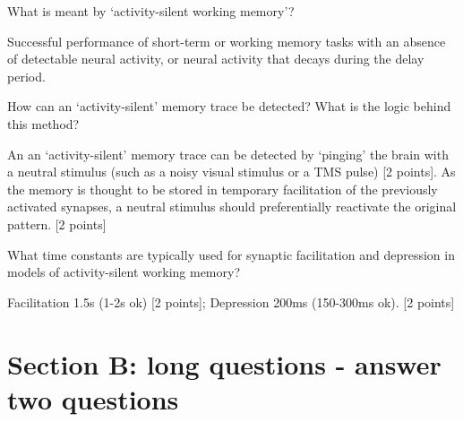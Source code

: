 \documentclass{cs-uob-exam}
\begin{document}
\begin{questions}
\question What is meant by `activity-silent working memory'?
\begin{solution}
Successful performance of short-term or working memory tasks with an absence of detectable neural activity, or neural activity that decays during the delay period.
\end{solution}

\question How can an `activity-silent' memory trace be detected? What is the logic behind this method?
\begin{solution}
An an ‘activity-silent’ memory trace can be detected by ‘pinging’ the brain with a neutral stimulus (such as a noisy visual stimulus or a TMS pulse) [2 points]. As the memory is thought to be stored in temporary facilitation of the previously activated synapses, a neutral stimulus should preferentially reactivate the original pattern. [2 points]
\end{solution}

\question What time constants are typically used for synaptic facilitation and depression in models of activity-silent working memory?

\begin{solution}
Facilitation 1.5s (1-2s ok) [2 points]; Depression 200ms (150-300ms ok). [2 points]
\end{solution}

\end{questions}
  
\section*{Section B: long questions - answer two questions}
\end{document}
